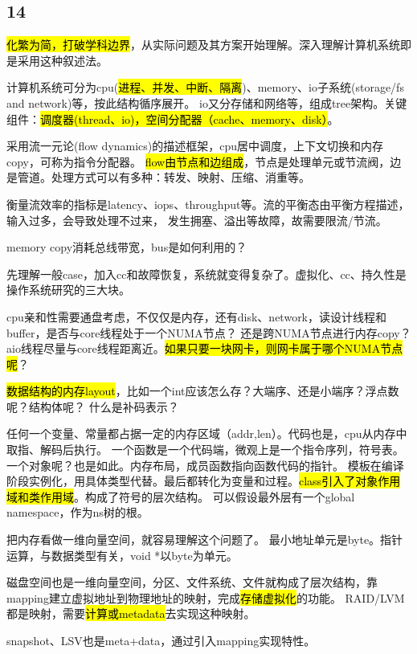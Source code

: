 \subsection{14}

\hl{化繁为简，打破学科边界}，从实际问题及其方案开始理解。深入理解计算机系统即是采用这种叙述法。

计算机系统可分为cpu(\hl{进程、并发、中断、隔离})、memory、io子系统(storage/fs and network)等，按此结构循序展开。
io又分存储和网络等，组成tree架构。关键组件：\hl{调度器(thread、io)，空间分配器（cache、memory、disk）}。

采用流一元论(flow dynamics)的描述框架，cpu居中调度，上下文切换和内存copy，可称为指令分配器。
\hl{flow由节点和边组成}，节点是处理单元或节流阀，边是管道。处理方式可以有多种：转发、映射、压缩、消重等。

衡量流效率的指标是latency、iops、throughput等。流的平衡态由平衡方程描述，输入过多，会导致处理不过来，
发生拥塞、溢出等故障，故需要限流/节流。

memory copy消耗总线带宽，bus是如何利用的？

先理解一般case，加入cc和故障恢复，系统就变得复杂了。虚拟化、cc、持久性是操作系统研究的三大块。

cpu亲和性需要通盘考虑，不仅仅是内存，还有disk、network，读设计线程和buffer，是否与core线程处于一个NUMA节点？
还是跨NUMA节点进行内存copy？ aio线程尽量与core线程距离近。\hl{如果只要一块网卡，则网卡属于哪个NUMA节点呢}？

\hrulefill

\hl{数据结构的内存layout}，比如一个int应该怎么存？大端序、还是小端序？浮点数呢？结构体呢？
什么是补码表示？

任何一个变量、常量都占据一定的内存区域（addr,len）。代码也是，cpu从内存中取指、解码后执行。
一个函数是一个代码端，微观上是一个指令序列，符号表。一个对象呢？也是如此。内存布局，成员函数指向函数代码的指针。
模板在编译阶段实例化，用具体类型代替。最后都转化为变量和过程。\hl{class引入了对象作用域和类作用域}。构成了符号的层次结构。
可以假设最外层有一个global namespace，作为ns树的根。

把内存看做一维向量空间，就容易理解这个问题了。
最小地址单元是byte。指针运算，与数据类型有关，void *以byte为单元。

磁盘空间也是一维向量空间，分区、文件系统、文件就构成了层次结构，靠mapping建立虚拟地址到物理地址的映射，完成\hl{存储虚拟化}的功能。
RAID/LVM都是映射，需要\hl{计算或metadata}去实现这种映射。

snapshot、LSV也是meta+data，通过引入mapping实现特性。

